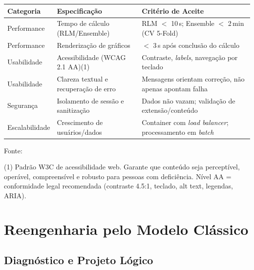 \begin{quadro}[ht]
\begin{center}
\small
\captionsetup{justification=centering, labelsep=endash, width=0.75\linewidth}
\caption{Especificação de requisitos não funcionais}
\label{quadro:rnf}
\begin{threeparttable}
\begin{tabularx}{\textwidth}{|l|X|X|} \hline
\textbf{Categoria} & \textbf{Especificação} & \textbf{Critério de Aceite} \\ \hline
Performance & Tempo de cálculo (RLM/Ensemble) & RLM $<$ 10\,s; Ensemble $<$ 2\,min (CV 5-Fold) \\ \hline
Performance & Renderização de gráficos & $<$ 3\,s após conclusão do cálculo \\ \hline
Usabilidade & Acessibilidade (WCAG 2.1 AA)(1) & Contraste, \textit{labels}, navegação por teclado \\ \hline
Usabilidade & Clareza textual e recuperação de erro & Mensagens orientam correção, não apenas apontam falha \\ \hline
Segurança & Isolamento de sessão e sanitização & Dados não vazam; validação de extensão/conteúdo \\ \hline
Escalabilidade & Crescimento de usuários/dados & Container com \textit{load balancer}; processamento em \textit{batch} \\ \hline
\end{tabularx}
\begin{tablenotes}[flushleft]
\footnotesize \item Fonte:~\oautor
\item (1) Padrão W3C de acessibilidade web. Garante que conteúdo seja perceptível, operável, compreensível e robusto para pessoas com deficiência. Nível AA = conformidade legal recomendada (contraste 4.5:1, teclado, alt text, legendas, ARIA).
\end{tablenotes}
\end{threeparttable}
\end{center}
\end{quadro}

\newpage
\section{Reengenharia pelo Modelo Clássico}
\label{sec:reengenharia}

\subsection{Diagnóstico e Projeto Lógico}
\label{subsec:diag-logico}

